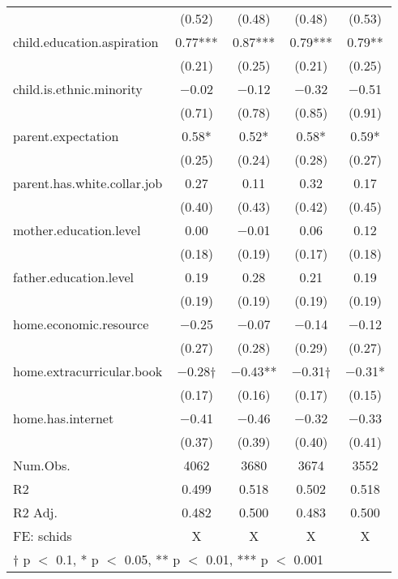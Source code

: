 \documentclass[
  man,floatsintext]{apa7}
\begin{document}
\begin{table}
\begin{tabular}[t]{lcccc}
 & (\num{0.52}) & (\num{0.48}) & (\num{0.48}) & (\num{0.53})\\
child.education.aspiration & \num{0.77}*** & \num{0.87}*** & \num{0.79}*** & \num{0.79}**\\
 & (\num{0.21}) & (\num{0.25}) & (\num{0.21}) & (\num{0.25})\\
child.is.ethnic.minority & \num{-0.02} & \num{-0.12} & \num{-0.32} & \num{-0.51}\\
 & (\num{0.71}) & (\num{0.78}) & (\num{0.85}) & (\num{0.91})\\
parent.expectation & \num{0.58}* & \num{0.52}* & \num{0.58}* & \num{0.59}*\\
 & (\num{0.25}) & (\num{0.24}) & (\num{0.28}) & (\num{0.27})\\
parent.has.white.collar.job & \num{0.27} & \num{0.11} & \num{0.32} & \num{0.17}\\
 & (\num{0.40}) & (\num{0.43}) & (\num{0.42}) & (\num{0.45})\\
mother.education.level & \num{0.00} & \num{-0.01} & \num{0.06} & \num{0.12}\\
 & (\num{0.18}) & (\num{0.19}) & (\num{0.17}) & (\num{0.18})\\
father.education.level & \num{0.19} & \num{0.28} & \num{0.21} & \num{0.19}\\
 & (\num{0.19}) & (\num{0.19}) & (\num{0.19}) & (\num{0.19})\\
home.economic.resource & \num{-0.25} & \num{-0.07} & \num{-0.14} & \num{-0.12}\\
 & (\num{0.27}) & (\num{0.28}) & (\num{0.29}) & (\num{0.27})\\
home.extracurricular.book & \num{-0.28}† & \num{-0.43}** & \num{-0.31}† & \num{-0.31}*\\
 & (\num{0.17}) & (\num{0.16}) & (\num{0.17}) & (\num{0.15})\\
home.has.internet & \num{-0.41} & \num{-0.46} & \num{-0.32} & \num{-0.33}\\
 & (\num{0.37}) & (\num{0.39}) & (\num{0.40}) & (\num{0.41})\\
\midrule
Num.Obs. & \num{4062} & \num{3680} & \num{3674} & \num{3552}\\
R2 & \num{0.499} & \num{0.518} & \num{0.502} & \num{0.518}\\
R2 Adj. & \num{0.482} & \num{0.500} & \num{0.483} & \num{0.500}\\
FE: schids & X & X & X & X\\
\bottomrule
\multicolumn{5}{l}{\rule{0pt}{1em}† p $<$ 0.1, * p $<$ 0.05, ** p $<$ 0.01, *** p $<$ 0.001}\\
\end{tabular}
\end{table}
\end{document}
